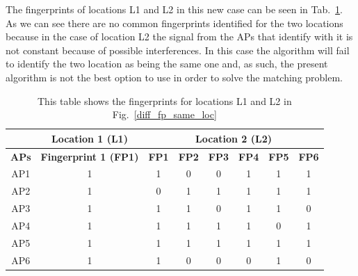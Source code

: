 The fingerprints of locations L1 and L2 in this new case can be seen in
Tab.~\ref{tab:table_fingerprints_same_loc}. As we can see there are no common
fingerprints identified for the two locations because in the case of location L2
the signal from the APs that identify with it is not constant because of
possible interferences. In this case the algorithm will fail to identify the two
location as being the same one and, as such, the present algorithm is not the
best option to use in order to solve the matching problem.

\begin{table}[h]
\begin{tabular}{|c|c|c|c|c|c|c|c|}
\hline
             & \textbf{Location 1 (L1)}     & \multicolumn{6}{c|}{\textbf{Location 2 (L2)}}                                           \\ \hline
\textbf{APs} & \textbf{Fingerprint 1 (FP1)} & \textbf{FP1} & \textbf{FP2} & \textbf{FP3} & \textbf{FP4} & \textbf{FP5} & \textbf{FP6} \\ \hline
AP1          & 1                            & 1            & 0            & 0            & 1            & 1            & 1            \\
AP2          & 1                            & 0            & 1            & 1            & 1            & 1            & 1            \\
AP3          & 1                            & 1            & 1            & 0            & 1            & 1            & 0            \\
AP4          & 1                            & 1            & 1            & 1            & 1            & 0            & 1            \\
AP5          & 1                            & 1            & 1            & 1            & 1            & 1            & 1            \\
AP6          & 1                            & 1            & 0            & 0            & 0            & 1            & 0            \\ \hline
\end{tabular}
\caption{This table shows the fingerprints for locations L1 and L2 in
Fig.~\ref{diff_fp_same_loc}}
\label{tab:table_fingerprints_same_loc}
\end{table}

